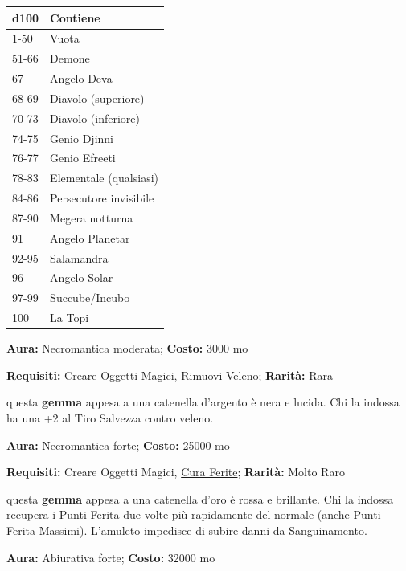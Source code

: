 \begin{multicols}{2}
\noindent\begin{tabularx}{\linewidth}{ll}
	\toprule
\rowcolor{gray!20}\textbf{d100} &\textbf{Contiene}\\
\toprule
1-50 &Vuota\\
\rowcolor{gray!20}51-66 &Demone \\
67 &Angelo Deva\\
\rowcolor{gray!20}68-69 &Diavolo (superiore)\\
70-73 &Diavolo (inferiore)\\
\rowcolor{gray!20}74-75 &Genio Djinni\\
76-77 &Genio Efreeti\\
\rowcolor{gray!20}78-83 &Elementale (qualsiasi)\\
84-86 &Persecutore invisibile\\
\rowcolor{gray!20}87-90 &Megera notturna\\
91 &Angelo Planetar\\
\rowcolor{gray!20}92-95 &Salamandra\\
96 &Angelo Solar\\
\rowcolor{gray!20}97-99 &Succube/Incubo\\
100 &La Topi
\end{tabularx}
\medskip


\textbf{Aura:} Necromantica moderata; \textbf{Costo:} 3000 mo

\textbf{Requisiti:} Creare Oggetti Magici, \hyperlink{Rimuovi Veleno}{Rimuovi Veleno}; \textbf{Rarità:} Rara

questa \textbf{gemma} appesa a una catenella d'argento è nera e lucida. Chi la indossa ha una +2 al Tiro Salvezza contro veleno.


\textbf{Aura:} Necromantica forte; \textbf{Costo:} 25000 mo

\textbf{Requisiti:} Creare Oggetti Magici, \hyperlink{Cura Ferite}{Cura Ferite}; \textbf{Rarità:} Molto Raro

questa \textbf{gemma} appesa a una catenella d'oro è rossa e brillante. Chi la indossa recupera i Punti Ferita due volte più rapidamente del normale (anche Punti Ferita Massimi). L'amuleto impedisce di subire danni da Sanguinamento.


\textbf{Aura:} Abiurativa forte; \textbf{Costo:} 32000 mo


\end{multicols}
